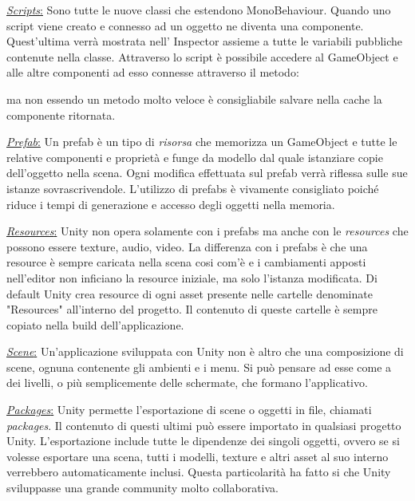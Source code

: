 \begin{flushleft}
	\underline{\textit{Scripts}:}
Sono tutte le nuove classi che estendono MonoBehaviour. Quando uno script viene creato e connesso ad un oggetto ne diventa una componente. Quest'ultima verrà mostrata nell' Inspector assieme a tutte le variabili pubbliche contenute nella classe. Attraverso lo script è possibile accedere al GameObject e alle altre componenti ad esso connesse attraverso il metodo:
\begin{algorithmic}
\end{algorithmic}
ma non essendo un metodo molto veloce è consigliabile salvare nella cache la componente ritornata. 
\end{flushleft}

\newpage

\begin{flushleft}
	\underline{\textit{Prefab}:}
	Un prefab è un tipo di \textit{risorsa} che memorizza un GameObject e tutte le relative componenti e proprietà e funge da modello dal quale istanziare copie dell'oggetto nella scena. Ogni modifica effettuata sul prefab verrà riflessa sulle sue istanze sovrascrivendole. L'utilizzo di prefabs è vivamente consigliato poiché riduce i tempi di generazione e accesso degli oggetti nella memoria.
\end{flushleft}

\begin{flushleft}
	\underline{\textit{Resources}:}
	Unity non opera solamente con i prefabs ma anche con le \textit{resources} che possono essere texture, audio, video. La differenza con i prefabs è che una resource è sempre caricata nella scena cosi com'è e i cambiamenti apposti nell'editor non inficiano la resource iniziale, ma solo l'istanza modificata.
	Di default Unity crea resource di ogni asset presente nelle cartelle denominate "Resources" all'interno del progetto. Il contenuto di queste cartelle è sempre copiato nella build dell'applicazione.
\end{flushleft}

\begin{flushleft}
	\underline{\textit{Scene}:}
	Un'applicazione sviluppata con Unity non è altro che una composizione di scene, ognuna contenente gli ambienti e i menu. Si può pensare ad esse come a dei livelli, o più semplicemente delle schermate, che formano l'applicativo.
\end{flushleft}
 
 \begin{flushleft}
 	\underline{\textit{Packages}:}
 Unity permette l'esportazione di scene o oggetti in file, chiamati \textit{packages}. Il contenuto di questi ultimi può essere importato in qualsiasi progetto Unity. L'esportazione include tutte le dipendenze dei singoli oggetti, ovvero se si volesse esportare una scena, tutti i modelli, texture e altri asset al suo interno verrebbero automaticamente inclusi. Questa particolarità ha fatto si che Unity sviluppasse una grande community molto collaborativa.
 \end{flushleft}
 

